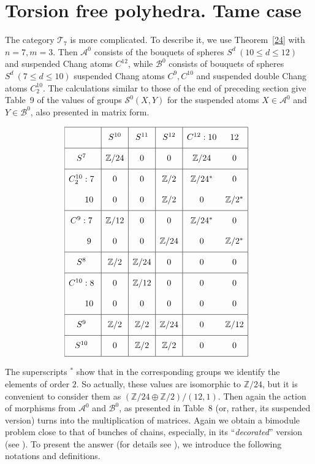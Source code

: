 \documentclass[12pt,a4paper]{amsart}
\theoremstyle{definition}
\theoremstyle{remark}
\numberwithin{equation}{section}
\begin{document}
\section{Torsion free polyhedra. Tame case}
 \label{s6}

  The category ${\mathscr T}_7$ is more complicated. To describe it, we use
  Theorem~\ref{24} with $n=7,m=3$. Then ${\mathscr A}^0$ consists of the
  bouquets of spheres $S^d\ (10\le d\le12)$ and suspended Chang atoms
  $C^{12}$, while ${\mathscr B}^0$ consists of bouquets of spheres
  $S^d\ (7\le d\le 10)$ suspended Chang atoms $C^9,C^{10}$ and
  suspended double Chang atoms $C^{10}_2$. The calculations similar
  to those of the end of preceding section give Table~9 of the values
  of groups ${\mathscr S}^0(X,Y)$ for the suspended atoms $X\in{\mathscr A}^0$ and 
  $Y\in{\mathscr B}^0$, also presented in matrix form.
  \begin{table}[!htp]
 \caption{}\vspace*{-1.4em}
 \[	\hspace*{-1.5ex}
	 \begin{array}{|c|c|c|c|cc|}
	 \hline
	 {\phantom{\bigg|}} & S^{10} & S^{11} & S^{12} & C^{12}:10 &12	 \\
	 \hline
	 S^7{\phantom{\bigg|}} & {\mathbb Z}/24 & 0 & 0 & {\mathbb Z}/24 & 0  \\
	 \hline
	 C^{10}_2: 7{\phantom{\bigg|}} & 0 & 0 & {\mathbb Z}/2 &  {\mathbb Z}/24^* & 0 \\
	 {\phantom{C^7:}} 10{\phantom{\bigg|}} & 0 & 0 & {\mathbb Z}/2 & 0 & {\mathbb Z}/2^* \\
	 \hline
	 C^9: 7{\phantom{\bigg|}} & {\mathbb Z}/12 &  0 & 0 & {\mathbb Z}/24^* & 0 \\
	 {\phantom{C^7:}} 9 {\phantom{\bigg|}} & 0& 0 & {\mathbb Z}/24 & 0 & {\mathbb Z}/2^*  \\
	 \hline
	 S^8{\phantom{\bigg|}} &  {\mathbb Z}/2 & {\mathbb Z}/24 & 0 & 0& 0 \\
	 \hline
	 C^{10}: 8{\phantom{\bigg|}} & 0 & {\mathbb Z}/12 & 0 & 0 & 0 \\
	 {\phantom{C^7:}} 10{\phantom{\bigg|}} & 0 & 0 & 0 & 0 & 0  \\  
	 \hline
	 S^9{\phantom{\bigg|}} &  {\mathbb Z}/2 &  {\mathbb Z}/2 & {\mathbb Z}/24 & 0 & {\mathbb Z}/12 \\
	 \hline
	 S^{10}{\phantom{\bigg|}} & 0& {\mathbb Z}/2 & {\mathbb Z}/2 & 0 & 0
	 \\  \hline
	\end{array}
\]
\end{table}
  The superscripts $^*$ show that in the corresponding groups we
  identify the elements of order $2$. So actually, these values are
  isomorphic to ${\mathbb Z}/24$, but it is convenient to consider them as
  $({\mathbb Z}/24{\oplus}{\mathbb Z}/2)/(12,1)$. Then again the action of morphisms from
  ${\mathscr A}^0$ and ${\mathscr B}^0$, as presented in Table~8 (or, rather, its 
  suspended version) turns into the multiplication of matrices.
  Again we obtain a bimodule problem close to that of bunches of
  chains, especially, in its ``\emph{decorated}'' version (see
  \cite{odk}). To present the answer (for details see \cite{d2}), we
  introduce the following notations and definitions.
\end{document}
